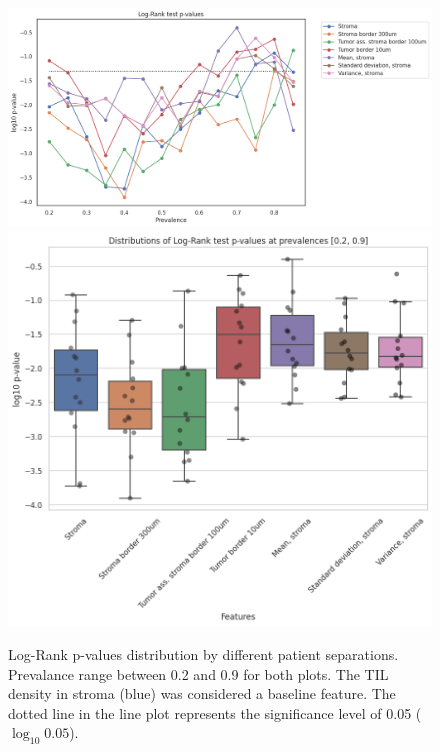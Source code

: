 \begin{figure}[h!]
\includegraphics[width=\linewidth]{figures/survival/pvalue_prevalence_all.png}
\includegraphics[width=0.764\linewidth]{figures/survival/pvalue_boxplot_all.png}
\caption{Log-Rank p-values distribution by different patient separations.
Prevalance range between 0.2 and 0.9 for both plots.
The TIL density in stroma (blue) was considered a baseline feature.
The dotted line in the line plot represents the significance level of 0.05 ($\log_{10} 0.05$).}
\label{fig:pvalues_tils}
\end{figure}

